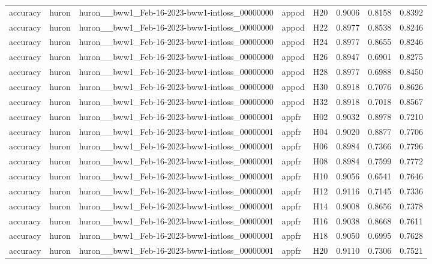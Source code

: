 \begin{table}[tbp]
\begin{tabular}{lllllrrr}
accuracy & huron & huron\_\_bww1\_Feb-16-2023-bww1-intloss\_00000000 & appod & H20 & 0.9006 & 0.8158 & 0.8392 \\
accuracy & huron & huron\_\_bww1\_Feb-16-2023-bww1-intloss\_00000000 & appod & H22 & 0.8977 & 0.8538 & 0.8246 \\
accuracy & huron & huron\_\_bww1\_Feb-16-2023-bww1-intloss\_00000000 & appod & H24 & 0.8977 & 0.8655 & 0.8246 \\
accuracy & huron & huron\_\_bww1\_Feb-16-2023-bww1-intloss\_00000000 & appod & H26 & 0.8947 & 0.6901 & 0.8275 \\
accuracy & huron & huron\_\_bww1\_Feb-16-2023-bww1-intloss\_00000000 & appod & H28 & 0.8977 & 0.6988 & 0.8450 \\
accuracy & huron & huron\_\_bww1\_Feb-16-2023-bww1-intloss\_00000000 & appod & H30 & 0.8918 & 0.7076 & 0.8626 \\
accuracy & huron & huron\_\_bww1\_Feb-16-2023-bww1-intloss\_00000000 & appod & H32 & 0.8918 & 0.7018 & 0.8567 \\
accuracy & huron & huron\_\_bww1\_Feb-16-2023-bww1-intloss\_00000001 & appfr & H02 & 0.9032 & 0.8978 & 0.7210 \\
accuracy & huron & huron\_\_bww1\_Feb-16-2023-bww1-intloss\_00000001 & appfr & H04 & 0.9020 & 0.8877 & 0.7706 \\
accuracy & huron & huron\_\_bww1\_Feb-16-2023-bww1-intloss\_00000001 & appfr & H06 & 0.8984 & 0.7366 & 0.7796 \\
accuracy & huron & huron\_\_bww1\_Feb-16-2023-bww1-intloss\_00000001 & appfr & H08 & 0.8984 & 0.7599 & 0.7772 \\
accuracy & huron & huron\_\_bww1\_Feb-16-2023-bww1-intloss\_00000001 & appfr & H10 & 0.9056 & 0.6541 & 0.7646 \\
accuracy & huron & huron\_\_bww1\_Feb-16-2023-bww1-intloss\_00000001 & appfr & H12 & 0.9116 & 0.7145 & 0.7336 \\
accuracy & huron & huron\_\_bww1\_Feb-16-2023-bww1-intloss\_00000001 & appfr & H14 & 0.9008 & 0.8656 & 0.7378 \\
accuracy & huron & huron\_\_bww1\_Feb-16-2023-bww1-intloss\_00000001 & appfr & H16 & 0.9038 & 0.8668 & 0.7611 \\
accuracy & huron & huron\_\_bww1\_Feb-16-2023-bww1-intloss\_00000001 & appfr & H18 & 0.9050 & 0.6995 & 0.7628 \\
accuracy & huron & huron\_\_bww1\_Feb-16-2023-bww1-intloss\_00000001 & appfr & H20 & 0.9110 & 0.7306 & 0.7521 \\

\end{tabular}
\end{table}

